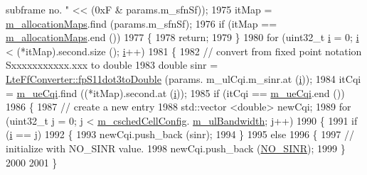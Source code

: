 \begin{DoxyCode}
{       subframe no. "} << (0xF & params.m\_sfnSf));
1975         itMap = \hyperlink{classns3_1_1TdTbfqFfMacScheduler_a0801127489d3eda5a462660c4af4c8bd}{m\_allocationMaps}.find (params.m\_sfnSf);
1976         \textcolor{keywordflow}{if} (itMap == \hyperlink{classns3_1_1TdTbfqFfMacScheduler_a0801127489d3eda5a462660c4af4c8bd}{m\_allocationMaps}.end ())
1977           \{
1978             \textcolor{keywordflow}{return};
1979           \}
1980         \textcolor{keywordflow}{for} (uint32\_t \hyperlink{bernuolliDistribution_8m_a6f6ccfcf58b31cb6412107d9d5281426}{i} = 0; \hyperlink{bernuolliDistribution_8m_a6f6ccfcf58b31cb6412107d9d5281426}{i} < (*itMap).second.size (); \hyperlink{bernuolliDistribution_8m_a6f6ccfcf58b31cb6412107d9d5281426}{i}++)
1981           \{
1982             \textcolor{comment}{// convert from fixed point notation Sxxxxxxxxxxx.xxx to double}
1983             \textcolor{keywordtype}{double} sinr = \hyperlink{classns3_1_1LteFfConverter_aa5d8c2a8f988dbd63da91818c18666eb}{LteFfConverter::fpS11dot3toDouble} (params.
      m\_ulCqi.m\_sinr.at (\hyperlink{bernuolliDistribution_8m_a6f6ccfcf58b31cb6412107d9d5281426}{i}));
1984             itCqi = \hyperlink{classns3_1_1TdTbfqFfMacScheduler_a5cf85878fa75fd31bdc63527492e9270}{m\_ueCqi}.find ((*itMap).second.at (\hyperlink{bernuolliDistribution_8m_a6f6ccfcf58b31cb6412107d9d5281426}{i}));
1985             \textcolor{keywordflow}{if} (itCqi == \hyperlink{classns3_1_1TdTbfqFfMacScheduler_a5cf85878fa75fd31bdc63527492e9270}{m\_ueCqi}.end ())
1986               \{
1987                 \textcolor{comment}{// create a new entry}
1988                 std::vector <double> newCqi;
1989                 \textcolor{keywordflow}{for} (uint32\_t j = 0; j < \hyperlink{classns3_1_1TdTbfqFfMacScheduler_a3ac3e4b1b3818ff204d6ff6c89c19f4d}{m\_cschedCellConfig}.
      \hyperlink{structns3_1_1FfMacCschedSapProvider_1_1CschedCellConfigReqParameters_a5ab5b102878e6e7e7727a14af4a64d2f}{m\_ulBandwidth}; j++)
1990                   \{
1991                     \textcolor{keywordflow}{if} (\hyperlink{bernuolliDistribution_8m_a6f6ccfcf58b31cb6412107d9d5281426}{i} == j)
1992                       \{
1993                         newCqi.push\_back (sinr);
1994                       \}
1995                     \textcolor{keywordflow}{else}
1996                       \{
1997                         \textcolor{comment}{// initialize with NO\_SINR value.}
1998                         newCqi.push\_back (\hyperlink{cqa-ff-mac-scheduler_8h_a520d71777be043568160c783a9c65fd5}{NO\_SINR});
1999                       \}
2000 
2001                   \}

\end{DoxyCode}
